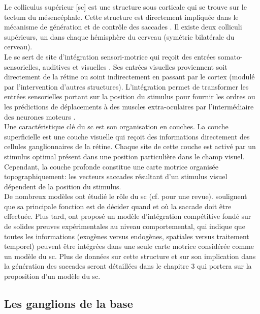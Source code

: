 Le colliculus supérieur [\gls{sc}] est une structure sous corticale qui se trouve sur le tectum du mésencéphale. Cette structure est directement impliquée dans le mécanisme de génération et de contrôle des saccades \cite{Nolte:1993,Ziad:1999}. Il existe deux colliculi supérieurs, un dans chaque hémisphère du cerveau (symétrie bilatérale du cerveau).\\


Le \gls{sc} sert de site d'intégration sensori-motrice qui reçoit des entrées somato-sensorielles, auditives et visuelles \cite {Nolte:1993}. Ses entrées visuelles proviennent soit directement de la rétine ou soint indirectement en passant par le cortex (modulé par l'intervention d'autres structures). L'intégration permet de transformer les entrées sensorielles portant sur la position du stimulus pour fournir les ordres ou les prédictions de déplacements à des muscles extra-oculaires par l'intermédiaire des neurones moteurs \cite {Wurtz:1996, Nolte:1993}.\\

Une caractéristique clé du \gls{sc} est son organisation en couches. La couche superficielle est une couche visuelle qui reçoit des informations directement des cellules ganglionnaires de la rétine. Chaque site de cette couche est activé par un stimulus optimal présent dans une position particulière dans le champ visuel. Cependant, la couche profonde constitue une carte motrice organisée topographiquement: les vecteurs saccades résultant d'un stimulus visuel dépendent de la position du stimulus.\\


De nombreux modèles ont étudié le rôle du \gls{sc} (cf. \cite {Girard:2005} pour une revue). \cite{Findlay:1999} soulignent que sa principale fonction est de décider quand et où la saccade doit être effectuée. Plus tard, \cite {Godijn:2002} ont proposé un modèle d'intégration compétitive fondé sur de solides preuves expérimentales au niveau comportemental, qui indique que toutes les informations (exogènes versus endogènes, spatiales versus traitement temporel) peuvent être intégrées dans une seule carte motrice considérée comme un modèle du \gls{sc}. Plus de données sur cette structure et sur son implication dans la génération des saccades seront détaillées dans le chapitre 3 qui portera sur la proposition d'un modèle du \gls{sc}.\\

\subsection{Les ganglions de la base}

